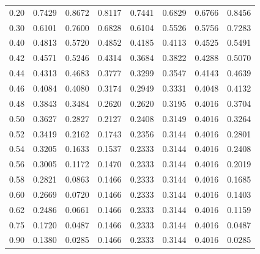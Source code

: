 \begin{table}[htbp]
\begin{tabular}{@{}lccccccc@{}}
0.20 & 0.7429 & 0.8672 & 0.8117 & 0.7441 & 0.6829 & 0.6766 & 0.8456 \\
0.30 & 0.6101 & 0.7600 & 0.6828 & 0.6104 & 0.5526 & 0.5756 & 0.7283 \\
0.40 & 0.4813 & 0.5720 & 0.4852 & 0.4185 & 0.4113 & 0.4525 & 0.5491 \\
0.42 & 0.4571 & 0.5246 & 0.4314 & 0.3684 & 0.3822 & 0.4288 & 0.5070 \\
0.44 & 0.4313 & 0.4683 & 0.3777 & 0.3299 & 0.3547 & 0.4143 & 0.4639 \\
0.46 & 0.4084 & 0.4080 & 0.3174 & 0.2949 & 0.3331 & 0.4048 & 0.4132 \\
0.48 & 0.3843 & 0.3484 & 0.2620 & 0.2620 & 0.3195 & 0.4016 & 0.3704 \\
0.50 & 0.3627 & 0.2827 & 0.2127 & 0.2408 & 0.3149 & 0.4016 & 0.3264 \\
0.52 & 0.3419 & 0.2162 & 0.1743 & 0.2356 & 0.3144 & 0.4016 & 0.2801 \\
0.54 & 0.3205 & 0.1633 & 0.1537 & 0.2333 & 0.3144 & 0.4016 & 0.2408 \\
0.56 & 0.3005 & 0.1172 & 0.1470 & 0.2333 & 0.3144 & 0.4016 & 0.2019 \\
0.58 & 0.2821 & 0.0863 & 0.1466 & 0.2333 & 0.3144 & 0.4016 & 0.1685 \\
0.60 & 0.2669 & 0.0720 & 0.1466 & 0.2333 & 0.3144 & 0.4016 & 0.1403 \\
0.62 & 0.2486 & 0.0661 & 0.1466 & 0.2333 & 0.3144 & 0.4016 & 0.1159 \\
0.75 & 0.1720 & 0.0487 & 0.1466 & 0.2333 & 0.3144 & 0.4016 & 0.0487 \\
0.90 & 0.1380 & 0.0285 & 0.1466 & 0.2333 & 0.3144 & 0.4016 & 0.0285 \\
\bottomrule
\end{tabular}
\end{table}

